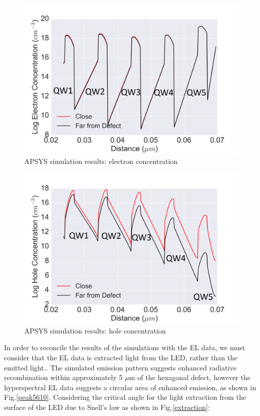 \begin{figure}[h]
	\centering
	\includegraphics[width=1\textwidth]{Figs/Ch3/shallowelec.png}
	\caption[h] {APSYS simulation results: electron concentration}
	\label{shallow_elec}
\end{figure}
\FloatBarrier 

\begin{figure}[h]
	\centering
	\includegraphics[width=1\textwidth]{Figs/Ch3/shallowhole.png}
	\caption[h] {APSYS simulation results: hole concentration}
	\label{shallow_hole}
\end{figure}
\FloatBarrier 

In order to reconcile the results of the simulations with the EL data, we must consider that the EL data is extracted light from the LED, rather than the emitted light.. The simulated emission pattern suggests enhanced radiative recombination within approximately 5 $\mu$m of the hexagonal defect, however the hyperspectral EL data suggests a circular area of enhanced emission, as shown in Fig.\ref{peak5610}. Considering the critical angle for the light extraction from the surface of the LED due to Snell's law as shown in Fig.\ref{extraction}:

